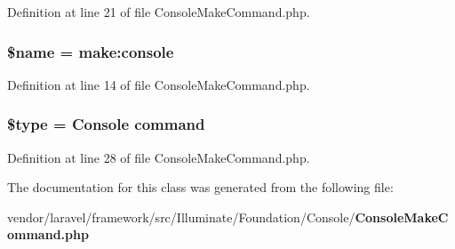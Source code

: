 Definition at line 21 of file Console\+Make\+Command.\+php.

\subsubsection[{\$name}]{\setlength{\rightskip}{0pt plus 5cm}\${\bf name} = \textquotesingle{}make\+:console\textquotesingle{}\hspace{0.3cm}{\ttfamily [protected]}}\label{class_illuminate_1_1_foundation_1_1_console_1_1_console_make_command_ab2fc40d43824ea3e1ce5d86dee0d763b}


Definition at line 14 of file Console\+Make\+Command.\+php.

\subsubsection[{\$type}]{\setlength{\rightskip}{0pt plus 5cm}\$type = \textquotesingle{}Console command\textquotesingle{}\hspace{0.3cm}{\ttfamily [protected]}}\label{class_illuminate_1_1_foundation_1_1_console_1_1_console_make_command_a9a4a6fba2208984cabb3afacadf33919}


Definition at line 28 of file Console\+Make\+Command.\+php.



The documentation for this class was generated from the following file\+:\begin{DoxyCompactItemize}
\item 
vendor/laravel/framework/src/\+Illuminate/\+Foundation/\+Console/{\bf Console\+Make\+Command.\+php}\end{DoxyCompactItemize}
